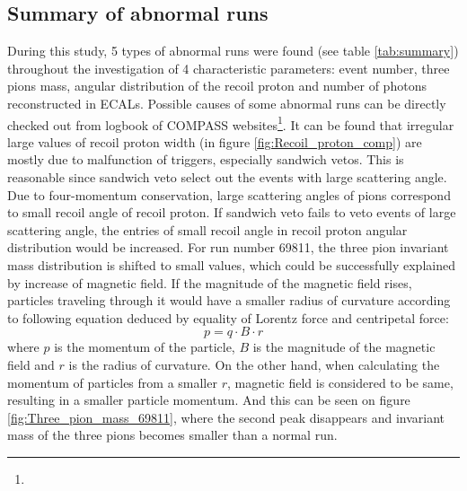 \subsection{Summary of abnormal runs}
During this study, 5 types of abnormal runs were found (see table \ref{tab:summary}) throughout the investigation of 4 characteristic parameters: event number, three pions mass, angular distribution of the recoil proton and number of photons reconstructed in ECALs. Possible causes of some abnormal runs can be directly checked out from logbook of COMPASS websites\footnote[2]{}. It can be found that irregular large values of recoil proton width (in figure \ref{fig:Recoil_proton_comp}) are mostly due to malfunction of triggers, especially sandwich vetos. This is reasonable since sandwich veto select out the events with large scattering angle. Due to four-momentum conservation, large scattering angles of pions correspond to small recoil angle of recoil proton. If sandwich veto fails to veto events of large scattering angle, the entries of small recoil angle in recoil proton angular distribution would be increased. For run number 69811, the three pion invariant mass distribution is shifted to small values, which could be successfully explained by increase of magnetic field. If the magnitude of the magnetic field rises, particles traveling through it would have a smaller radius of curvature according to following equation deduced by equality of Lorentz force and centripetal force:
\begin{equation}
p = q\cdot B\cdot r
\end{equation}
where $p$ is the momentum of the particle, $B$ is the magnitude of the magnetic field and $r$ is the radius of curvature. On the other hand, when calculating the momentum of particles from a smaller $r$, magnetic field is considered to be same, resulting in a smaller particle momentum. And this can be seen on figure \ref{fig:Three_pion_mass_69811}, where the second peak disappears and invariant mass of the three pions becomes smaller than a normal run.

